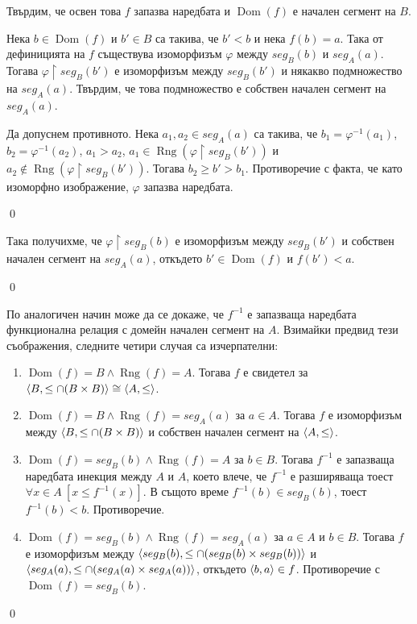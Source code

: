 \quad
Твърдим, че освен това $f$ запазва наредбата и $\operatorname{Dom}(f)$ е начален сегмент на $B$.

\begin{tcolorbox}[mybox={Доказателство:}]
\quad
Нека $b \in \operatorname{Dom}(f)$ и $b' \in B$ са такива, че $b' < b$
и нека $f(b) = a$.
Така от дефиницията на $f$ съществува изоморфизъм $\varphi$ между $seg_B(b)$ и  $seg_A(a)$.
Тогава $\varphi \restriction seg_B(b')$ е изоморфизъм между $seg_B(b')$ и някакво подмножество на $seg_A(a)$.
Твърдим, че това подмножество е собствен начален сегмент на $seg_A(a)$.
\begin{tcolorbox}[mybox={Доказателство:}, colback=green!20, colframe=green!60]
\quad
Да допуснем противното.
Нека $a_1, a_2 \in seg_A(a)$ са такива, че
$b_1 = \varphi^{-1}(a_1)$,
$b_2 = \varphi^{-1}(a_2)$,
$a_1 > a_2$, $a_1 \in \operatorname{Rng}(\varphi \restriction seg_B(b'))$ и
$a_2 \notin \operatorname{Rng}(\varphi \restriction seg_B(b'))$.
Тогава $b_2 \ge b' > b_1$.
Противоречие с факта, че като изоморфно изображение, $\varphi$ запазва наредбата.

\qed
\end{tcolorbox}

\quad
Така получихме, че $\varphi \restriction seg_B(b)$ е изоморфизъм между $seg_B(b')$ и собствен начален сегмент на $seg_A(a)$,
откъдето $b' \in \operatorname{Dom}(f)$ и $f(b') < a$.

\qed
\end{tcolorbox}

\quad
По аналогичен начин може да се докаже, че $f^{-1}$ е запазваща наредбата функционална релация с
домейн начален сегмент на $A$.
Взимайки предвид тези съображения, следните четири случая са изчерпателни:

\begin{enumerate}[label={\arabic* сл.}]
\item
$\operatorname{Dom}(f) = B \land \operatorname{Rng}(f) = A$.
Тогава $f$ е свидетел за
$\langle B, \leq \cap (B \times B) \rangle \cong \langle A, \leq \rangle$.

\item
$\operatorname{Dom}(f) = B \land \operatorname{Rng}(f) = seg_A(a)$ за $a \in A$.
Тогава $f$ е изоморфизъм между $\langle B, \leq \cap (B \times B) \rangle$ и собствен начален сегмент на $\langle A, \leq \rangle$.

\item
$\operatorname{Dom}(f) = seg_B(b) \land \operatorname{Rng}(f) = A$ за $b \in B$.
Тогава $f^{-1}$ е запазваща наредбата инекция между $A$ и $A$, което влече, че $f^{-1}$ е разширяваща
тоест $\forall x \in A\ [x \leq f^{-1}(x)]$. В същото време $f^{-1}(b) \in seg_B(b)$, тоест $f^{-1}(b) < b$. Противоречие.

\item
$\operatorname{Dom}(f) = seg_B(b) \land \operatorname{Rng}(f) = seg_A(a)$ за $a \in A$ и $b \in B$.
Тогава $f$ е изоморфизъм между
$\langle seg_B(b), \leq \cap (seg_B(b) \times seg_B(b)) \rangle$ и
$\langle seg_A(a), \leq \cap (seg_A(a) \times seg_A(a)) \rangle$,
откъдето $\langle b, a \rangle \in f$. Противоречие с $\operatorname{Dom}(f) = seg_B(b)$.
\end{enumerate}

\qed
